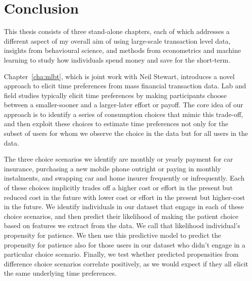 \chapter{Conclusion}%
\label{cha:conclusion}

This thesis consists of three stand-alone chapters, each of which addresses a
different aspect of my overall aim of using large-scale transaction level data,
insights from behavioural science, and methods from econometrics and machine
learning to study how individuals spend money and save for the short-term.

Chapter~\ref{cha:mlbt}, which is joint work with Neil Stewart, introduces a
novel approach to elicit time preferences from mass financial transaction data.
Lab and field studies typically elicit time preferences by making participants
choose between a smaller-sooner and a larger-later effort or payoff. The core
idea of our approach is to identify a series of consumption choices that mimic
this trade-off, and then exploit these choices to estimate time preferences not
only for the subset of users for whom we observe the choice in the data but for
all users in the data.

The three choice scenarios we identify are monthly or yearly payment for car
insurance, purchasing a new mobile phone outright or paying in monthly
instalments, and swapping car and home insurer frequently or infrequently.
Each of these choices implicitly trades off a higher cost or effort in the
present but reduced cost in the future with lower cost or effort in the present
but higher-cost in the future. We identify individuals in our dataset that
engage in each of these choice scenarios, and then predict their likelihood of
making the patient choice based on features we extract from the data. We call
that likelihood individual's propensity for patience. We then use this
predictive model to predict the propensity for patience also for those users in
our dataset who didn't engage in a particular choice scenario. Finally, we test
whether predicted propensities from difference choice scenarios correlate
positively, as we would expect if they all elicit the same underlying time
preferences.

